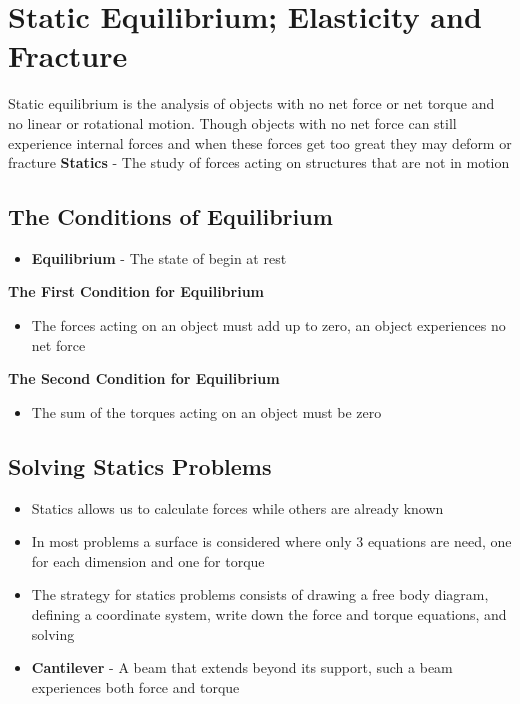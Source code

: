 \section{Static Equilibrium; Elasticity and Fracture}
Static equilibrium is the analysis of objects with no net force or net torque and no linear or rotational motion. Though objects with no net force can still experience internal forces and when these forces get too great they may deform or fracture
\textbf{Statics} - The study of forces acting on structures that are not in motion

\subsection{The Conditions of Equilibrium}
\begin{itemize}
    \item \textbf{Equilibrium} - The state of begin at rest
\end{itemize}

\textbf{The First Condition for Equilibrium}
\begin{itemize}
    \item The forces acting on an object must add up to zero, an object experiences no net force
\end{itemize}

\textbf{The Second Condition for Equilibrium}
\begin{itemize}
    \item The sum of the torques acting on an object must be zero
\end{itemize}

\subsection{Solving Statics Problems}
\begin{itemize}
    \item Statics allows us to calculate forces while others are already known
    \item In most problems a surface is considered where only 3 equations are need, one for each dimension and one for torque
    \item The strategy for statics problems consists of drawing a free body diagram, defining a coordinate system, write down the force and torque equations, and solving
    \item \textbf{Cantilever} - A beam that extends beyond its support, such a beam experiences both force and torque
\end{itemize}

